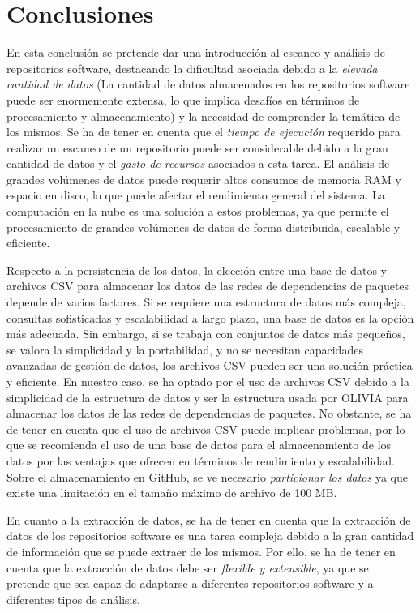 

\section{Conclusiones}

En esta conclusión se pretende dar una introducción al escaneo y análisis de repositorios software, destacando la dificultad asociada debido
a la \emph{elevada cantidad de datos} (La cantidad de datos almacenados en los repositorios software puede ser enormemente extensa,
lo que implica desafíos en términos de procesamiento y almacenamiento) y la necesidad de comprender la temática de los mismos. 
Se ha de tener en cuenta que el \emph{tiempo de ejecución}  requerido para realizar un escaneo  de un repositorio puede
ser considerable debido a la gran cantidad de datos  y el \emph{gasto de recursos} asociados a esta tarea. El análisis de grandes
volúmenes de datos puede requerir altos consumos de memoria RAM y espacio en disco, lo que puede afectar el rendimiento general del sistema.
La computación en la nube es una solución a estos problemas, ya que permite el procesamiento de grandes volúmenes de
datos de forma distribuida, escalable y eficiente.

Respecto a la persistencia de los datos, la elección entre una base de datos y archivos CSV para almacenar los datos de las redes de dependencias
de paquetes depende de varios factores. Si se requiere una estructura de datos más compleja, consultas sofisticadas y escalabilidad a largo plazo,
una base de datos es la opción más adecuada. Sin embargo, si se trabaja con conjuntos de datos más pequeños, se valora la simplicidad y la portabilidad,
y no se necesitan capacidades avanzadas de gestión de datos, los archivos CSV pueden ser una solución práctica y eficiente.
En nuestro caso, se ha optado por el uso de archivos CSV debido a la simplicidad de la estructura de datos y ser la estructura usada por OLIVIA para
almacenar los datos de las redes de dependencias de paquetes. No obstante, se ha de tener en cuenta que el uso de archivos CSV puede implicar
problemas, por lo que se recomienda el uso de una base de datos para el almacenamiento de los datos por las ventajas que ofrecen en términos de
rendimiento y escalabilidad.
Sobre el almacenamiento en GitHub, se ve necesario \emph{particionar los datos} ya que existe una limitación en el tamaño máximo de archivo de 100 MB.

En cuanto a la extracción de datos, se ha de tener en cuenta que la extracción de datos de los repositorios software es una tarea compleja debido
a la gran cantidad de información que se puede extraer de los mismos. Por ello, se ha de tener en cuenta que la extracción de datos debe ser
\emph{flexible y extensible}, ya que se pretende que sea capaz de adaptarse a diferentes repositorios software y a diferentes tipos de análisis.


